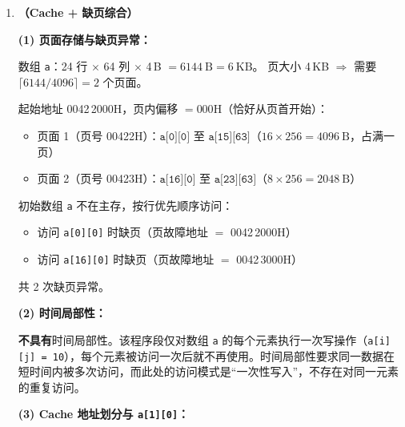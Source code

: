 \documentclass[12pt,a4paper]{ctexart}
\begin{document}
\begin{enumerate}[leftmargin=*,resume]
该页（虚页号 2E3H）对应的页表项虚拟地址：
\[
\mathrm{B8C0\,0000H} + \mathrm{2E3H} \times 4 = \mathrm{B8C0\,0000H} + \mathrm{B8CH} = \mathrm{B8C0\,0B8CH}
\]

该页表项中的页框号（页表所在物理页框）：
\[
\mathrm{6540\,0000H} \gg 22 = 0110\,0101\,01_{\mathrm{B}} = \mathrm{195H}
\]

\textbf{答案：}
\begin{itemize}
\item 页表所在页的页号：2E3H
\item 对应页表项的虚拟地址：B8C0\,0B8CH
\item 页框号：195H
\end{itemize}

\newpage

\item \textbf{（Cache + 缺页综合）}

\medskip
\textbf{(1) 页面存储与缺页异常：}

数组 \texttt{a}：24 行 $\times$ 64 列 $\times$ 4\,B $= 6144\:\mathrm{B} = 6\:\mathrm{KB}$。
页大小 4\,KB $\Rightarrow$ 需要 $\lceil 6144/4096 \rceil = 2$ 个页面。

起始地址 0042\,2000H，页内偏移 $= 000\mathrm{H}$（恰好从页首开始）：
\begin{itemize}
\item 页面 1（页号 00422H）：$\texttt{a[0][0]}$ 至 $\texttt{a[15][63]}$（$16 \times 256 = 4096\:\mathrm{B}$，占满一页）
\item 页面 2（页号 00423H）：$\texttt{a[16][0]}$ 至 $\texttt{a[23][63]}$（$8 \times 256 = 2048\:\mathrm{B}$）
\end{itemize}

初始数组 \texttt{a} 不在主存，按行优先顺序访问：
\begin{itemize}
\item 访问 \texttt{a[0][0]} 时缺页（页故障地址 $=$ 0042\,2000H）
\item 访问 \texttt{a[16][0]} 时缺页（页故障地址 $=$ 0042\,3000H）
\end{itemize}

共 2 次缺页异常。

\textbf{(2) 时间局部性：}

\textbf{不具有}时间局部性。该程序段仅对数组 \texttt{a} 的每个元素执行一次写操作（\texttt{a[i][j] = 10}），每个元素被访问一次后就不再使用。时间局部性要求同一数据在短时间内被多次访问，而此处的访问模式是“一次性写入”，不存在对同一元素的重复访问。

\textbf{(3) Cache 地址划分与 \texttt{a[1][0]}：}


\end{enumerate}
\end{document}
